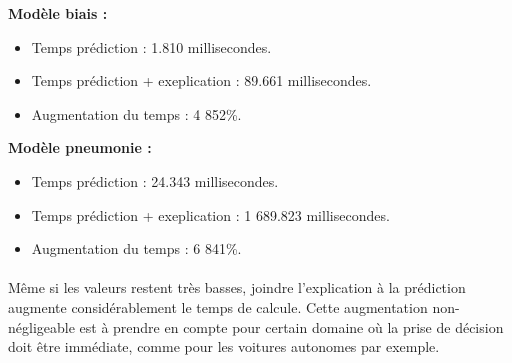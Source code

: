 \textbf{Modèle biais :}
\begin{itemize}
    \item Temps prédiction : 1.810 millisecondes.
    \item Temps prédiction + exeplication : 89.661 millisecondes.
    \item Augmentation du temps : 4 852\%.
\end{itemize}

\textbf{Modèle pneumonie :}
\begin{itemize}
    \item Temps prédiction : 24.343 millisecondes.
    \item Temps prédiction + exeplication : 1 689.823 millisecondes.
    \item Augmentation du temps : 6 841\%.
\end{itemize}
\paragraph{} Même si les valeurs restent très basses, joindre l'explication à la prédiction augmente considérablement le temps de calcule. Cette augmentation non-négligeable est à prendre en compte pour certain domaine où la prise de décision doit être immédiate, comme pour les voitures autonomes par exemple.